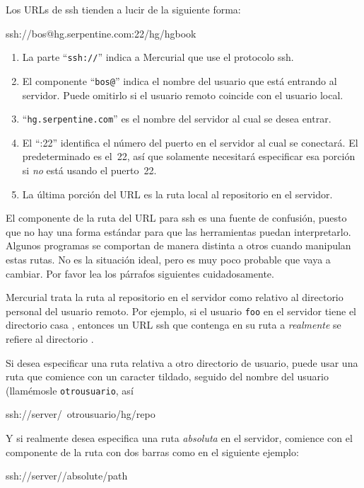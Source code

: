 Los URLs de ssh tienden a lucir de la siguiente forma:
\begin{codesample2}
  ssh://bos@hg.serpentine.com:22/hg/hgbook
\end{codesample2}
\begin{enumerate}
\item La parte ``\texttt{ssh://}'' indica a Mercurial que use el
  protocolo ssh.
\item El componente ``\texttt{bos@}'' indica el nombre del usuario que
  está entrando al servidor.  Puede omitirlo si el usuario remoto
  coincide con el usuario local.
\item ``\texttt{hg.serpentine.com}'' es el nombre del servidor al cual
  se desea entrar.
\item El ``:22'' identifica el número del puerto en el servidor al cual
  se conectará.  El predeterminado es el~22, así que solamente
  necesitará especificar esa porción si \emph{no} está usando el
  puerto~22.
\item La última porción del URL es la ruta local al repositorio en el
  servidor.
\end{enumerate}

El componente de la ruta del URL para ssh es una fuente de confusión,
puesto que no hay una forma estándar para que las herramientas puedan
interpretarlo.  Algunos programas se comportan de manera distinta a
otros cuando manipulan estas rutas.  No es la situación ideal, pero
es muy poco probable que vaya a cambiar.  Por favor lea los párrafos
siguientes cuidadosamente.

Mercurial trata la ruta al repositorio en el servidor como relativo al
directorio personal del usuario remoto.  Por ejemplo, si el usuario
\texttt{foo} en el servidor tiene el directorio casa
,
entonces un URL ssh que contenga en su ruta a 
\emph{realmente} se refiere al directorio .

Si desea especificar una ruta relativa a otro directorio de usuario,
puede usar una ruta que comience con un caracter tildado, seguido del
nombre del usuario (llamémosle \texttt{otrousuario}, así
\begin{codesample2}
  ssh://server/~otrousuario/hg/repo
\end{codesample2}

Y si realmente desea especifica una ruta \emph{absoluta} en el
servidor, comience con el componente de la ruta con dos barras como
en el siguiente ejemplo:
\begin{codesample2}
  ssh://server//absolute/path
\end{codesample2}

